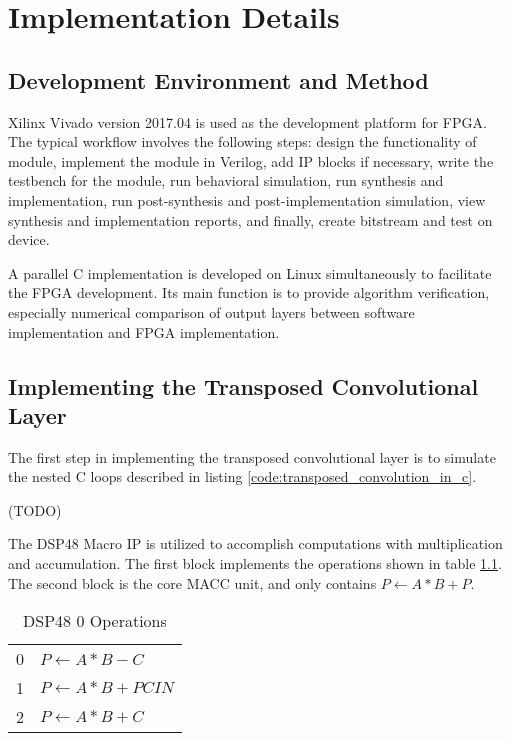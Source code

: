 
\chapter{Implementation Details}

\section{Development Environment and Method}

Xilinx Vivado version 2017.04 is used as the development platform for FPGA. The typical workflow involves
the following steps: design the functionality of module, implement the module in Verilog, add IP blocks
if necessary, write the testbench for the module, run behavioral simulation, run synthesis and implementation,
run post-synthesis and post-implementation simulation, view synthesis and implementation reports, and finally,
create bitstream and test on device.

A parallel C implementation is developed on Linux simultaneously to facilitate the FPGA development.
Its main function is to provide algorithm verification, especially numerical comparison of output layers
between software implementation and FPGA implementation.

\section{Implementing the Transposed Convolutional Layer}

The first step in implementing the transposed convolutional layer is to simulate the nested C loops
described in listing \ref{code:transposed_convolution_in_c}. %

(TODO)

The DSP48 Macro IP is utilized to accomplish computations with multiplication and accumulation. The first
block implements the operations shown in table \ref{table:dsp48_0_operations}. The second block is the core
MACC unit, and only contains $P \leftarrow A*B+P$.

\begin{table}[h]
  \centering
  \caption{DSP48 0 Operations}
  \begin{tabular}{l | l}
    0 & $P \leftarrow A*B-C$ \\
    1 & $P \leftarrow A*B+PCIN$ \\
    2 & $P \leftarrow A*B+C$
  \end{tabular}
  \label{table:dsp48_0_operations}
\end{table}

